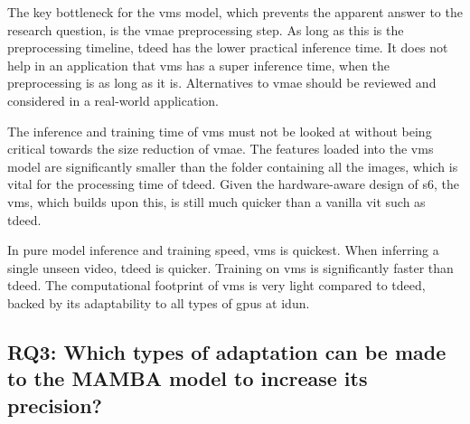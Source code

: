 The key bottleneck for the \acrshort{vms} model, which prevents the apparent answer to the research question, is the \acrshort{vmae} preprocessing step. As long as this is the preprocessing timeline, \acrshort{tdeed} has the lower practical inference time. It does not help in an application that \acrshort{vms} has a super inference time, when the preprocessing is as long as it is. Alternatives to \acrshort{vmae} should be reviewed and considered in a real-world application. 

The inference and training time of \acrshort{vms} must not be looked at without being critical towards the size reduction of \acrshort{vmae}. The features loaded into the \acrshort{vms} model are significantly smaller than the folder containing all the images, which is vital for the processing time of \acrshort{tdeed}. Given the hardware-aware design of \acrfull{s6}, the \acrshort{vms}, which builds upon this, is still much quicker than a vanilla \acrfull{vit} such as \acrshort{tdeed}.

In pure model inference and training speed, \acrshort{vms} is quickest. When inferring a single unseen video, \acrshort{tdeed} is quicker. Training on \acrshort{vms} is significantly faster than \acrshort{tdeed}. The computational footprint of \acrshort{vms} is very light compared to \acrshort{tdeed}, backed by its adaptability to all types of \acrshort{gpu}s at \acrshort{idun}. 


\subsection{RQ3: Which types of adaptation can be made to the MAMBA model to increase its precision?}



